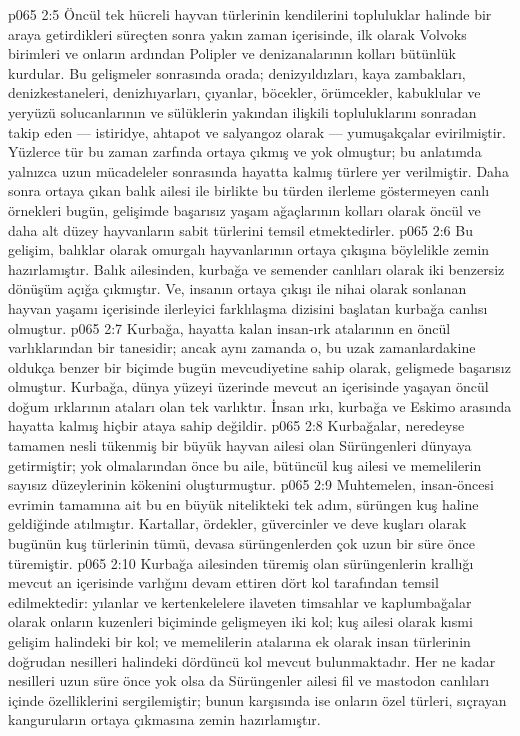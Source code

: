 \vs p065 2:5 Öncül tek hücreli hayvan türlerinin kendilerini topluluklar halinde bir araya getirdikleri süreçten sonra yakın zaman içerisinde, ilk olarak Volvoks birimleri ve onların ardından Polipler ve denizanalarının kolları bütünlük kurdular. Bu gelişmeler sonrasında orada; denizyıldızları, kaya zambakları, denizkestaneleri, denizhıyarları, çıyanlar, böcekler, örümcekler, kabuklular ve yeryüzü solucanlarının ve sülüklerin yakından ilişkili topluluklarını sonradan takip eden --- istiridye, ahtapot ve salyangoz olarak --- yumuşakçalar evirilmiştir. Yüzlerce tür bu zaman zarfında ortaya çıkmış ve yok olmuştur; bu anlatımda yalnızca uzun mücadeleler sonrasında hayatta kalmış türlere yer verilmiştir. Daha sonra ortaya çıkan balık ailesi ile birlikte bu türden ilerleme göstermeyen canlı örnekleri bugün, gelişimde başarısız yaşam ağaçlarının kolları olarak öncül ve daha alt düzey hayvanların sabit türlerini temsil etmektedirler.
\vs p065 2:6 Bu gelişim, balıklar olarak omurgalı hayvanlarının ortaya çıkışına böylelikle zemin hazırlamıştır. Balık ailesinden, kurbağa ve semender canlıları olarak iki benzersiz dönüşüm açığa çıkmıştır. Ve, insanın ortaya çıkışı ile nihai olarak sonlanan hayvan yaşamı içerisinde ilerleyici farklılaşma dizisini başlatan kurbağa canlısı olmuştur.
\vs p065 2:7 Kurbağa, hayatta kalan insan\hyp{}ırk atalarının en öncül varlıklarından bir tanesidir; ancak aynı zamanda o, bu uzak zamanlardakine oldukça benzer bir biçimde bugün mevcudiyetine sahip olarak, gelişmede başarısız olmuştur. Kurbağa, dünya yüzeyi üzerinde mevcut an içerisinde yaşayan öncül doğum ırklarının ataları olan tek varlıktır. İnsan ırkı, kurbağa ve Eskimo arasında hayatta kalmış hiçbir ataya sahip değildir.
\vs p065 2:8 Kurbağalar, neredeyse tamamen nesli tükenmiş bir büyük hayvan ailesi olan Sürüngenleri dünyaya getirmiştir; yok olmalarından önce bu aile, bütüncül kuş ailesi ve memelilerin sayısız düzeylerinin kökenini oluşturmuştur.
\vs p065 2:9 Muhtemelen, insan\hyp{}öncesi evrimin tamamına ait bu en büyük nitelikteki tek adım, sürüngen kuş haline geldiğinde atılmıştır. Kartallar, ördekler, güvercinler ve deve kuşları olarak bugünün kuş türlerinin tümü, devasa sürüngenlerden çok uzun bir süre önce türemiştir.
\vs p065 2:10 Kurbağa ailesinden türemiş olan sürüngenlerin krallığı mevcut an içerisinde varlığını devam ettiren dört kol tarafından temsil edilmektedir: yılanlar ve kertenkelelere ilaveten timsahlar ve kaplumbağalar olarak onların kuzenleri biçiminde gelişmeyen iki kol; kuş ailesi olarak kısmi gelişim halindeki bir kol; ve memelilerin atalarına ek olarak insan türlerinin doğrudan nesilleri halindeki dördüncü kol mevcut bulunmaktadır. Her ne kadar nesilleri uzun süre önce yok olsa da Sürüngenler ailesi fil ve mastodon canlıları içinde özelliklerini sergilemiştir; bunun karşısında ise onların özel türleri, sıçrayan kanguruların ortaya çıkmasına zemin hazırlamıştır.
